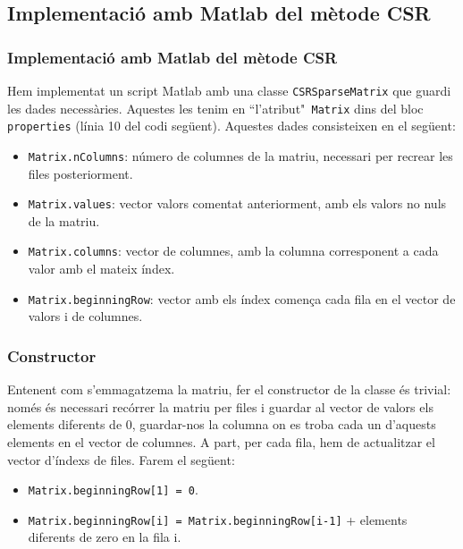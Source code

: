 \documentclass[8pt]{beamer}
\begin{document}
\subsection{Implementació amb Matlab del mètode CSR}
\begin{frame}
  \frametitle{Implementació amb Matlab del mètode CSR}
  Hem implementat un script Matlab amb una classe \texttt{CSRSparseMatrix} que guardi les dades necessàries. Aquestes les tenim en ``l'atribut"\texttt{ Matrix} dins del bloc \texttt{properties} (línia 10 del codi següent). Aquestes dades consisteixen en el següent:	
\begin{itemize}
\item  \texttt{Matrix.nColumns}: número de columnes de la matriu, necessari per recrear les files posteriorment.
\item  \texttt{Matrix.values}: vector valors comentat anteriorment, amb els valors no nuls de la matriu.
\item  \texttt{Matrix.columns}: vector de columnes, amb la columna corresponent a cada valor amb el mateix índex.
\item  \texttt{Matrix.beginningRow}: vector amb els índex comença cada fila en el vector de valors i de columnes.
\end{itemize}
\end{frame}

\begin{frame}
 \end{frame}

\begin{frame}
  \frametitle{Constructor}
  \hypertarget{Constructor}{}
  Entenent com s'emmagatzema la matriu, fer el constructor de la classe és trivial: només és necessari recórrer la matriu per files i guardar al vector de valors els elements diferents de 0, guardar-nos la columna on es troba cada un d'aquests elements en el vector de columnes. A part, per cada fila, hem de actualitzar el vector d'índexs de files. Farem el següent:
\begin{itemize}
\item \texttt{Matrix.beginningRow[1] = 0}.
\item \texttt{Matrix.beginningRow[i] = Matrix.beginningRow[i-1]} + elements diferents de zero en la fila i.
\end{itemize}
\end{frame}

\begin{frame}
  
\end{frame}
\end{document}
